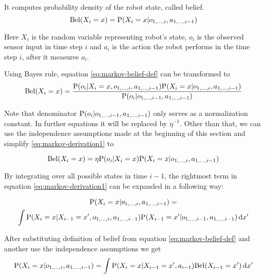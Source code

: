 It computes probability density of the robot state, called belief.
\begin{equation}
	\label{eq:markov-belief-def}
	\Bel(X_i = x) = \P(X_i = x | o_{1, \dotsc, i}, a_{1,\dotsc,i - 1})
\end{equation}

Here \(X_i\) is the random variable representing robot's state,
\(o_i\) is the observed sensor input in time step \(i\) and \(a_i\)
is the action the robot performs in the time step \(i\), after it
measures \(o_i\).

Using Bayes rule, equation \eqref{eq:markov-belief-def} can be transformed to
\begin{equation}
	\label{eq:markov-derivation1}
	\Bel(X_i = x) =
	\frac{
		\P(o_i | X_i = x, o_{1, \dotsc, i}, a_{1,\dotsc,i - 1})
		\P(X_i = x | o_{1, \dotsc, i}, a_{1, \dotsc, i - 1})
	}{
		\P(o_i | o_{1, \dotsc, i-1}, a_{1, \dotsc, i-1})
	}
\end{equation}

Note that denominator \(\P(o_i | o_{1, \dotsc, i-1}, a_{1, \dotsc, i-1})\) only
serves as a normalization constant.
In further equations it will be replaced by \(\eta^{-1}\).
Other than that, we can use the independence assumptions made at the beginning
of this section and simplify \eqref{eq:markov-derivation1} to

\begin{equation}
	\label{eq:markov-derivation2}
	\Bel(X_i = x) =
		\eta \P(o_i | X_i = x)
		\P(X_i = x | o_{1, \dotsc, i}, a_{1, \dotsc, i - 1})
\end{equation}


By integrating over all possible states in time \(i - 1\), the rightmost term in
equation \eqref{eq:markov-derivation1} can be expanded in a following way:

\begin{multline}
	\label{eq:markov-derivation3}
	\P(X_i = x | o_{1, \dotsc, i}, a_{1, \dotsc, i - 1}) = \\
	\int
	\P(X_i = x | X_{i - 1}=x', o_{1, \dotsc, i}, a_{1, \dotsc, i - 1})
	\P(X_{i-1} = x' | o_{1, \dotsc, i-1}, a_{1, \dotsc, i-1})
	\,\mathrm{d}x'
\end{multline}

After substituting definition of belief from equation \eqref{eq:markov-belief-def}
and another use the independence assumptions we get
\begin{equation}
	\label{eq:markov-derivation4}
	\P(X_i = x | o_{1, \dotsc, i}, a_{1, \dotsc, i - 1}) = 
	\int
	\P(X_i = x | X_{i - 1}=x', a_{i - 1})
	\Bel(X_{i-1} = x')
	\,\mathrm{d}x'
\end{equation}


